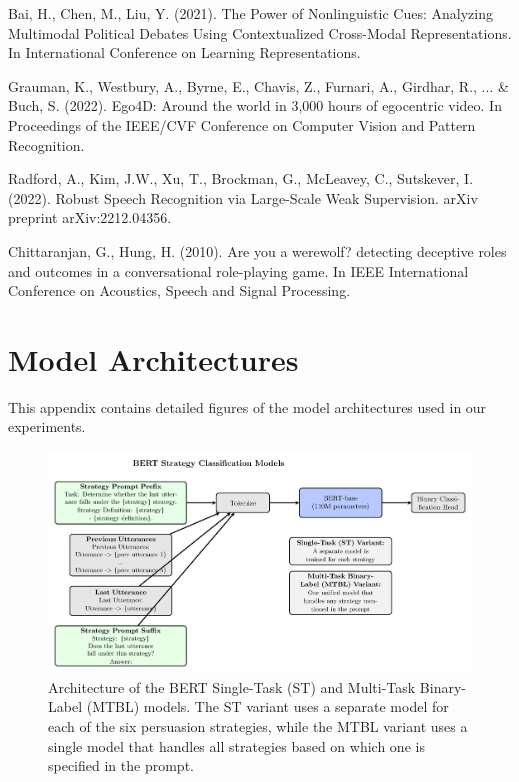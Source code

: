 \documentclass{article}
\begin{document}
\begin{thebibliography}{10}
Bai, H., Chen, M., Liu, Y. (2021). The Power of Nonlinguistic Cues: Analyzing Multimodal Political Debates Using Contextualized Cross-Modal Representations. In International Conference on Learning Representations.

Grauman, K., Westbury, A., Byrne, E., Chavis, Z., Furnari, A., Girdhar, R., ... \& Buch, S. (2022). Ego4D: Around the world in 3,000 hours of egocentric video. In Proceedings of the IEEE/CVF Conference on Computer Vision and Pattern Recognition.

Radford, A., Kim, J.W., Xu, T., Brockman, G., McLeavey, C., Sutskever, I. (2022). Robust Speech Recognition via Large-Scale Weak Supervision. arXiv preprint arXiv:2212.04356.

Chittaranjan, G., Hung, H. (2010). Are you a werewolf? detecting deceptive roles and outcomes in a conversational role-playing game. In IEEE International Conference on Acoustics, Speech and Signal Processing.

\end{thebibliography}

\appendix
\section{Model Architectures}
This appendix contains detailed figures of the model architectures used in our experiments.

\begin{figure}[H]
    \centering
    \includegraphics[width=\textwidth]{figures/png/bert_st_and_mtbl.png}
    \caption{Architecture of the BERT Single-Task (ST) and Multi-Task Binary-Label (MTBL) models. The ST variant uses a separate model for each of the six persuasion strategies, while the MTBL variant uses a single model that handles all strategies based on which one is specified in the prompt.}
    \label{fig:app_bert_st_and_mtbl}
\end{figure}
\end{document}
